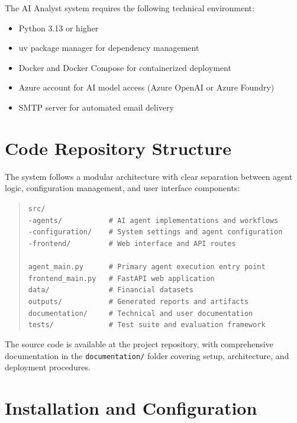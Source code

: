 \documentclass[a4paper]{report}
\begin{document}
The AI Analyst system requires the following technical environment:

\begin{itemize}
    \item Python 3.13 or higher
    \item uv package manager for dependency management
    \item Docker and Docker Compose for containerized deployment
    \item Azure account for AI model access (Azure OpenAI or Azure Foundry)
    \item SMTP server for automated email delivery
\end{itemize}

\section{Code Repository Structure}

The system follows a modular architecture with clear separation between agent logic, configuration management, and user interface components:

\begin{quote}
\texttt{src/}\\
\texttt{-agents/~~~~~~~~~~~\# AI agent implementations and workflows}\\
\texttt{-configuration/~~~~\# System settings and agent configuration}\\
\texttt{-frontend/~~~~~~~~~\# Web interface and API routes}\\
\\
\texttt{agent\_main.py~~~~~~\# Primary agent execution entry point}\\
\texttt{frontend\_main.py~~~\# FastAPI web application}\\
\texttt{data/~~~~~~~~~~~~~~\# Financial datasets}\\
\texttt{outputs/~~~~~~~~~~~\# Generated reports and artifacts}\\
\texttt{documentation/~~~~~\# Technical and user documentation}\\
\texttt{tests/~~~~~~~~~~~~~\# Test suite and evaluation framework}
\end{quote}

The source code is available at the project repository, with comprehensive documentation in the \texttt{documentation/} folder covering setup, architecture, and deployment procedures.

\section{Installation and Configuration}
\end{document}
